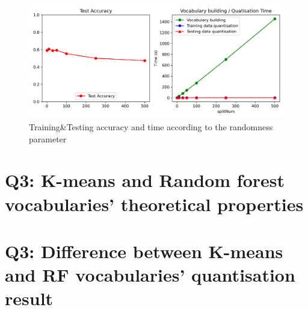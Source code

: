 \begin{figure}[htbp]
	\centering
	\includegraphics[width=0.5\linewidth]{image/q3-fig5.png}
	\caption{Training\&Testing accuracy and time according to the randomness parameter}
	\label{fig:q3-fig5}
\end{figure}

\section{Q3: K-means and Random forest vocabularies' theoretical properties}
\label{subsec:Q3-app1}
\begin{table}[htbp]
	\centering
	\setlength{\tabcolsep}{6pt} %
	\renewcommand{\arraystretch}{1.5} %
	\caption{Theoretical properties of vocabulary method: K-means and RF}
	\label{table:q3-app-1}
\end{table}

\section{Q3: Difference between K-means and RF vocabularies' quantisation result}
\label{subsec:Q3-app2}

